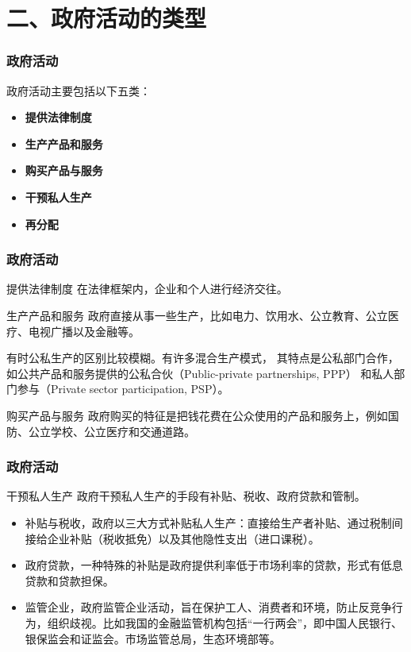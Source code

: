 \documentclass[aspectratio=169, 12pt]{beamer}
\begin{document}
\section{二、政府活动的类型}

\begin{frame}[plain]
    \frametitle{政府活动}
    政府活动主要包括以下五类：
    \begin{itemize}
        \item \textbf{提供法律制度}
        \item \textbf{生产产品和服务}
        \item \textbf{购买产品与服务}
        \item \textbf{干预私人生产}
        \item \textbf{再分配}
    \end{itemize}
\end{frame}

\begin{frame}[plain]
    \frametitle{政府活动}
    \begin{block}{提供法律制度}
        在法律框架内，企业和个人进行经济交往。
    \end{block}
    \begin{block}{生产产品和服务}
        政府直接从事一些生产，比如电力、饮用水、公立教育、公立医疗、电视广播以及金融等。
        \par
        有时公私生产的区别比较模糊。有许多混合生产模式，
        其特点是公私部门合作，如公共产品和服务提供的公私合伙（Public-private partnerships, PPP）
        和私人部门参与（Private sector participation, PSP）。
    \end{block}
    \begin{block}{购买产品与服务}
        政府购买的特征是把钱花费在公众使用的产品和服务上，例如国防、公立学校、公立医疗和交通道路。
    \end{block}
\end{frame}

\begin{frame}[plain]
    \frametitle{政府活动}
    \begin{block}{干预私人生产}
        政府干预私人生产的手段有补贴、税收、政府贷款和管制。
        \begin{itemize}
            \item 补贴与税收，政府以三大方式补贴私人生产：直接给生产者补贴、通过税制间接给企业补贴（税收抵免）以及其他隐性支出（进口课税）。
            \item 政府贷款，一种特殊的补贴是政府提供利率低于市场利率的贷款，形式有低息贷款和贷款担保。
            \item 监管企业，政府监管企业活动，旨在保护工人、消费者和环境，防止反竞争行为，组织歧视。比如我国的金融监管机构包括“一行两会”，即中国人民银行、银保监会和证监会。市场监管总局，生态环境部等。
        \end{itemize}
    \end{block}
\end{frame}
\end{document}

